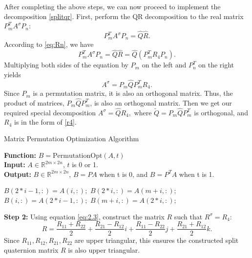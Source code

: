 \documentclass[1p]{elsarticle}
\numberwithin{equation}{section}
\begin{document}
After completing the above steps, we can now proceed to implement the decomposition \eqref{splitqr}.
First, perform the QR decomposition to the real matrix $P_m^TA^\sigma P_{n}$:
\[P_m^TA^\sigma P_n = \widehat{Q}\widehat{R}.\]
According to \eqref{eq:Rn}, we have
\[P_m^TA^\sigma P_n = \widehat{Q}\widehat{R} = \widehat{Q}(P_m^TR_4P_n).\]
Multiplying both sides of the equation by $P_m$ on the left and $P_n^T$ on the right yields
\[A^\sigma=P_m\widehat{Q}P_m^T R_4.\]
Since $P_m$ is a permutation matrix, it is also an orthogonal matrix. Thus, the product of matrices, $P_m\widehat{Q}P_m^T$, is also an orthogonal matrix. Then we get our required special decomposition $A^\sigma=\widehat{Q}R_4,$ where $\widetilde{Q}=P_m\widehat{Q}P_m^T$ is orthogonal, and $R_4$ is in the form of \eqref{r4}.

\begin{algorithm}[htbp]
    \caption{Matrix Permutation Optimization Algorithm}
    \label{alg:Permutation Optimization}
    \textbf{Function:} $B=\text{PermutationOpt}(A,t)$\\
    \textbf{Input:} \indent  $ A\in \mathbb{R}^{2m\times 2n}$, $t$ is 0 or 1. \\
    {\textbf{Output:}}  $B \in\mathbb{R}^{2m\times 2n}$, $B=PA$ when t is 0, and $B=P^TA$ when t is 1.
\begin{algorithmic}
                \State $B(2*i-1, :) = A(i, :);$
                \State $B(2*i, :) = A(m+i, :);$
            \EndFor
          \Else
                \State $B(i, :) = A(2*i-1, :);$
                \State $B(m+i, :) = A(2*i, :);$
            \EndFor
          \EndIf
\end{algorithmic}
\end{algorithm}

\textbf{Step 2:} Using equation \eqref{eq:2.3}, construct the matrix $R$ such that $R^\sigma=R_4:$
$$
R = \frac{R_{11} + R_{22}}{2} + \frac{R_{21} - R_{12}}{2}i + \frac{R_{11} - R_{22}}{2}j + \frac{R_{21} + R_{12}}{2}k.
$$
Since $R_{11}, R_{12}, R_{21}, R_{22}$ are upper triangular, this ensures the constructed split quaternion matrix $R$ is also upper triangular.
\end{document}

